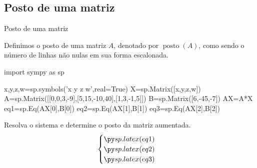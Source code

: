 \subsection*{Posto de uma matriz}
%
%
%

\begin{frame}[label=sistemas,fragile=singleslide]{Posto de uma matriz}

\begin{defin}
Definimos o {\color{blue} posto} de uma matriz $A$, denotado por $\operatorname{posto}(A)$, como sendo o número de linhas não nulas em sua forma escalonada.
\end{defin}

\begin{pycode}
import sympy as sp

x,y,z,w=sp.symbols('x y z w',real=True)
X=sp.Matrix([x,y,z,w])
A=sp.Matrix([[0,0,3,-9],[5,15,-10,40],[1,3,-1,5]])
B=sp.Matrix([6,-45,-7])
AX=A*X
eq1=sp.Eq(AX[0],B[0])
eq2=sp.Eq(AX[1],B[1])
eq3=sp.Eq(AX[2],B[2])
\end{pycode}

\begin{exe}
Resolva o sistema e determine o posto da matriz aumentada.
\[\begin{cases}
\pyl{eq1}\\
\pyl{eq2}\\
\pyl{eq3}
\end{cases}\]
\end{exe}
\end{frame}


